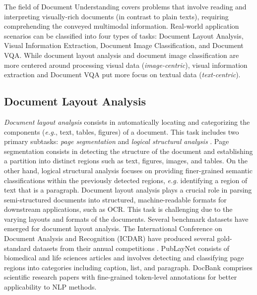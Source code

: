 The field of Document Understanding covers problems that involve reading and interpreting visually-rich documents (in contrast to plain texts), requiring comprehending the conveyed multimodal information. Real-world application scenarios can be classified into four types of tasks: Document Layout Analysis, Visual Information Extraction, Document Image Classification, and \ac{Document VQA}. While document layout analysis and document image classification are more centered around processing visual data (\textit{image-centric}), visual information extraction and \ac{Document VQA} put more focus on textual data (\textit{text-centric}).

\subsection{Document Layout Analysis}

\textit{Document layout analysis} consists in automatically locating and categorizing the components (\textit{e.g.}, text, tables, figures) of a document. This task includes two primary subtasks: \textit{page segmentation} and \textit{logical structural analysis} \citep{binmakhashen2019document}. Page segmentation consists in detecting the structure of the document and establishing a partition into distinct regions such as text, figures, images, and tables. On the other hand, logical structural analysis focuses on providing finer-grained semantic classifications within the previously detected regions, \textit{e.g.} identifying a region of text that is a paragraph. Document layout analysis plays a crucial role in parsing semi-structured documents into structured, machine-readable formats for downstream applications, such as \ac{OCR}. This task is challenging due to the varying layouts and formats of the documents. Several benchmark datasets have emerged for document layout analysis. The International Conference on Document Analysis and Recognition (ICDAR) have produced several gold-standard datasets from their annual competitions \citep{antonacopoulos2013icdar, gao2017icdar2017}. PubLayNet \citep{zhong2019publaynet} consists of biomedical and life sciences articles and involves detecting and classifying page regions into categories including caption, list, and paragraph. 
DocBank \citep{li2020docbank} comprises scientific research papers with fine-grained token-level annotations for better applicability to \ac{NLP} methods.

